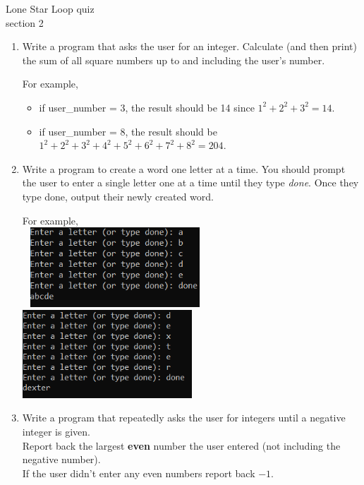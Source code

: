 \documentclass{article}
\begin{document}
\pagebreak
Lone Star \hfill Loop quiz\\
section 2\\
\begin{enumerate}
	\item 
		Write a program that asks the user for an integer.  Calculate (and then print) the 
		sum of all square numbers up to and including the user's number.

		For example, 
		\begin{itemize}
			\item if user\_number = 3, the result should be 14 since $1^2 + 2^2 + 3^2 = 14$.
			\item if user\_number = 8, the result should be $1^2+2^2+3^2+4^2+5^2+6^2+7^2+8^2=204$.
		\end{itemize}









	\item 
		Write a program to create a word one letter at a time.  You should prompt the user to enter 
		a single letter one at a time until they type \textit{done}.  Once they type done, output 
		their newly created word.
		
		For example, \\ \ \hfill
		\includegraphics[width = 2.5in]{./imgs/lettersAbcde.PNG} \hfill  
		\includegraphics[width = 2.5in]{./imgs/lettersDexter.PNG} \hfill \


	\item 
		Write a program that repeatedly asks the user for integers until a negative integer is 
		given.\\  Report back the largest \textbf{even} number the user entered 
		(not including the negative number).  \\
		If the user didn't enter any even numbers report back $-1$.


\end{enumerate}
\end{document}
